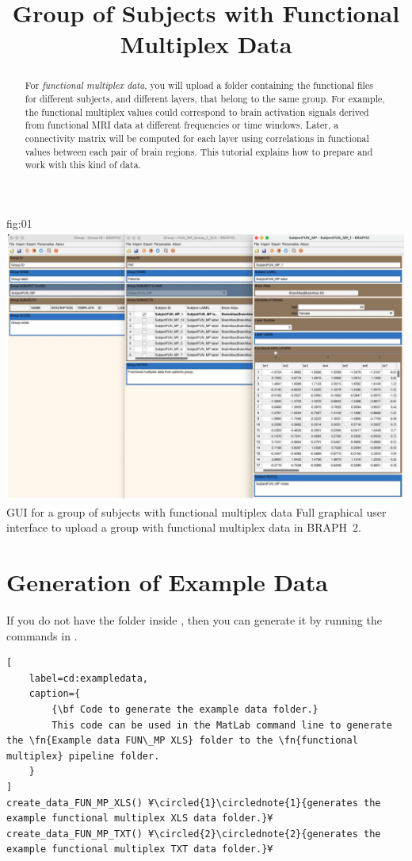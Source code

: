 \documentclass[justified]{tufte-handout}
\title{Group of Subjects with Functional Multiplex Data}
\begin{document}
\maketitle

\begin{abstract}
\noindent
For \emph{functional multiplex data}, you will upload a folder containing the functional files for different subjects, and different layers, that belong to the same group. For example, the functional multiplex values could correspond to brain activation signals derived from functional MRI data at different frequencies or time windows.  Later, a connectivity matrix will be computed for each layer using correlations in functional values between each pair of brain regions. This tutorial explains how to prepare and work with this kind of data.
\end{abstract}


\tableofcontents

	{fig:01}
	{\includegraphics{fig01.jpg}}
	{GUI for a group of subjects with functional multiplex data}
	{
	Full graphical user interface to upload a group with functional multiplex data in BRAPH~2. 
	}

\clearpage
\section{Generation of Example Data}

If you do not have the  folder inside , then you can generate it by running the commands in .

\begin{lstlisting}[
	label=cd:exampledata,
	caption={
		{\bf Code to generate the example data folder.}
		This code can be used in the MatLab command line to generate the \fn{Example data FUN\_MP XLS} folder to the \fn{functional multiplex} pipeline folder.
	}
]
create_data_FUN_MP_XLS() ¥\circled{1}\circlednote{1}{generates the example functional multiplex XLS data folder.}¥
create_data_FUN_MP_TXT() ¥\circled{2}\circlednote{2}{generates the example functional multiplex TXT data folder.}¥
\end{lstlisting}
\end{document}
